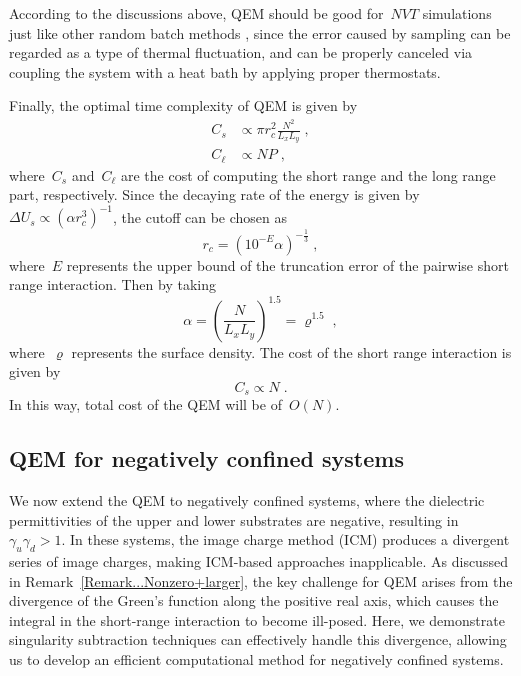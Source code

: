 According to the discussions above, QEM should be good for~$NVT$ simulations just like other random batch methods \cite{jin2020random, jin2021random}, since the error caused by sampling can be regarded as a type of thermal fluctuation, and can be properly canceled via coupling the system with a heat bath by applying proper thermostats.

Finally, the optimal time complexity of QEM is given by
\begin{align}
    C_s & \propto \pi r_c^2 \frac{N^2}{L_x L_y}\;,\\
    C_\ell & \propto N P\;,
\end{align}
where~$C_s$ and~$C_\ell$ are the cost of computing the short range and the long range part, respectively.
Since the decaying rate of the energy is given by~$\Delta U_s \propto (\alpha r_c^3)^{-1}$, the cutoff can be chosen as
\begin{equation}
    r_c = (10^{-E} \alpha)^{-\frac{1}{3}}\;,
\end{equation}
where~$E$ represents the upper bound of the truncation error of the pairwise short range interaction.
Then by taking
\begin{equation}\label{eq:alphs-select}
    \alpha = \left(\frac{N}{L_x L_y} \right)^{1.5} = {\varrho}^{1.5}\;,
\end{equation}
where~$\varrho$ represents the surface density.
The cost of the short range interaction is given by
\begin{equation}
    C_s \propto  N\;.
\end{equation}
In this way, total cost of the QEM will be of~$O(N)$.


\subsection{QEM for negatively confined systems}

We now extend the QEM to negatively confined systems, where the dielectric permittivities of the upper and lower substrates are negative, resulting in~$\gamma_u \gamma_d > 1$. 
In these systems, the image charge method (ICM) produces a divergent series of image charges, making ICM-based approaches inapplicable.
As discussed in Remark~\ref{Remark...Nonzero+larger}, the key challenge for QEM arises from the divergence of the Green's function along the positive real axis, which causes the integral in the short-range interaction to become ill-posed.
Here, we demonstrate singularity subtraction techniques can effectively handle this divergence, allowing us to develop an efficient computational method for negatively confined systems.

